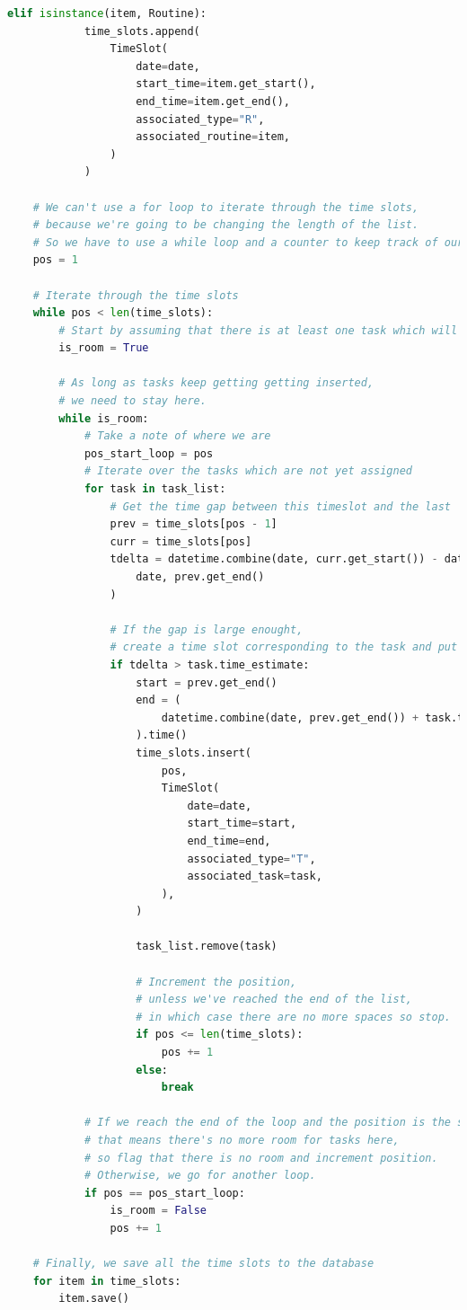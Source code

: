 \documentclass{article}
\begin{document}
\begin{lstlisting}[language=Python]
        elif isinstance(item, Routine):
            time_slots.append(
                TimeSlot(
                    date=date,
                    start_time=item.get_start(),
                    end_time=item.get_end(),
                    associated_type="R",
                    associated_routine=item,
                )
            )

    # We can't use a for loop to iterate through the time slots,
    # because we're going to be changing the length of the list.
    # So we have to use a while loop and a counter to keep track of our position.
    pos = 1

    # Iterate through the time slots
    while pos < len(time_slots):
        # Start by assuming that there is at least one task which will fit in this time gap
        is_room = True

        # As long as tasks keep getting getting inserted,
        # we need to stay here.
        while is_room:
            # Take a note of where we are
            pos_start_loop = pos
            # Iterate over the tasks which are not yet assigned
            for task in task_list:
                # Get the time gap between this timeslot and the last
                prev = time_slots[pos - 1]
                curr = time_slots[pos]
                tdelta = datetime.combine(date, curr.get_start()) - datetime.combine(
                    date, prev.get_end()
                )

                # If the gap is large enought,
                # create a time slot corresponding to the task and put it here
                if tdelta > task.time_estimate:
                    start = prev.get_end()
                    end = (
                        datetime.combine(date, prev.get_end()) + task.time_estimate
                    ).time()
                    time_slots.insert(
                        pos,
                        TimeSlot(
                            date=date,
                            start_time=start,
                            end_time=end,
                            associated_type="T",
                            associated_task=task,
                        ),
                    )

                    task_list.remove(task)

                    # Increment the position,
                    # unless we've reached the end of the list,
                    # in which case there are no more spaces so stop.
                    if pos <= len(time_slots):
                        pos += 1
                    else:
                        break

            # If we reach the end of the loop and the position is the same,
            # that means there's no more room for tasks here,
            # so flag that there is no room and increment position.
            # Otherwise, we go for another loop.
            if pos == pos_start_loop:
                is_room = False
                pos += 1

    # Finally, we save all the time slots to the database
    for item in time_slots:
        item.save()
\end{lstlisting}
\end{document}
